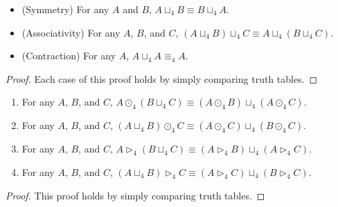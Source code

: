 \begin{lemma}[Choice]
  \label{lemma:choice_props}
  \begin{itemize}
  \item[] (Symmetry) For any $A$ and $B$, $A \sqcup_4 B \equiv B \sqcup_4 A$.\\
  \item[] (Associativity) For any $A$, $B$, and $C$, $(A \sqcup_4 B) \sqcup_4 C \equiv A \sqcup_4 (B \sqcup_4 C)$.\\
  \item[] (Contraction) For any $A$, $A \sqcup_4 A \equiv_4 A$.
  \end{itemize}
\end{lemma}
\begin{proof}
  Each case of this proof holds by simply comparing truth tables.
\end{proof}

\begin{lemma}
  \label{lemma:dist_laws}
  \begin{enumerate}[label=\roman*.]
  \item For any $A$, $B$, and $C$, $A \odot_4 (B \sqcup_4 C) \equiv (A \odot_4 B) \sqcup_4 (A \odot_4 C)$.\\
  \item For any $A$, $B$, and $C$, $(A \sqcup_4 B) \odot_4 C \equiv (A \odot_4 C) \sqcup_4 (B \odot_4 C)$.\\
  \item For any $A$, $B$, and $C$, $A \rhd_4 (B \sqcup_4 C) \equiv (A \rhd_4 B) \sqcup_4 (A \rhd_4 C)$.\\
  \item For any $A$, $B$, and $C$, $(A \sqcup_4 B) \rhd_4 C \equiv (A \rhd_4 C) \sqcup_4 (B \rhd_4 C)$.
  \end{enumerate}
\end{lemma}
\begin{proof}
  This proof holds by simply comparing truth tables.
\end{proof}

